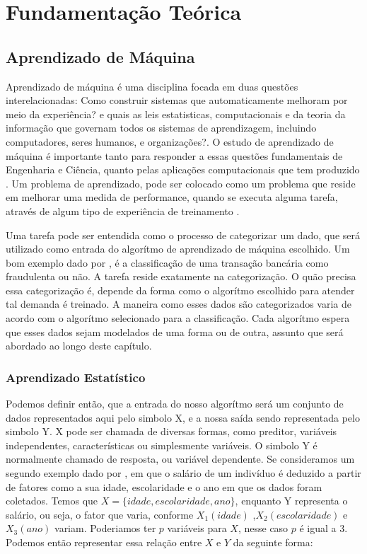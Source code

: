 \chapter{Fundamentação Teórica}

\section{Aprendizado de Máquina}
Aprendizado de máquina é uma disciplina focada em duas questões interelacionadas: Como construir sistemas que automaticamente melhoram por meio da experiência? e quais as leis estatisticas,
computacionais e da teoria da informação que governam todos os sistemas de aprendizagem, incluindo computadores, seres humanos, e organizações?. O estudo de aprendizado de máquina é importante tanto
para responder a essas questões fundamentais de Engenharia e Ciência, quanto pelas aplicações computacionais que tem produzido \cite{Jordan}.
Um problema de aprendizado, pode ser colocado como um problema que reside em melhorar uma medida de performance, quando se executa alguma tarefa, através de algum tipo de experiência de treinamento \cite{Jordan}.

Uma tarefa pode ser entendida como o processo de categorizar um dado, que será utilizado como entrada do algorítmo de aprendizado de máquina escolhido. Um bom exemplo dado por \cite{Jordan}, é a classificação de uma
transação bancária como fraudulenta ou não. A tarefa reside exatamente na categorização. O quão precisa essa categorização é, depende da forma como o algorítmo escolhido para atender tal demanda é treinado. A maneira como
esses dados são categorizados varia de acordo com o algorítmo selecionado para a classificação. Cada algorítmo espera que esses dados sejam modelados de uma forma ou de outra, assunto que será abordado ao longo deste capítulo.

\subsection{Aprendizado Estatístico}
Podemos definir então, que a entrada do nosso algorítmo será um conjunto de dados representados aqui pelo simbolo X, e a nossa saída sendo representada pelo simbolo Y. 
X pode ser chamada de diversas formas, como preditor, variáveis independentes, características ou simplesmente variáveis. 
O simbolo Y é normalmente chamado de resposta, ou variável dependente. Se consideramos um segundo exemplo dado por \cite{James}, em que o salário de um indivíduo é deduzido a partir
de fatores como a sua idade, escolaridade e o ano em que os dados foram coletados. Temos que $X = \{idade, escolaridade, ano\}$, enquanto Y representa o salário, ou seja, o fator que varia,
conforme $X_1(idade)$  ,$X_2(escolaridade)$ e $X_3(ano)$ variam. Poderiamos ter $p$ variáveis para $X$, nesse caso $p$ é igual a 3.
Podemos então representar essa relação entre $X$ e $Y$ da seguinte forma:

